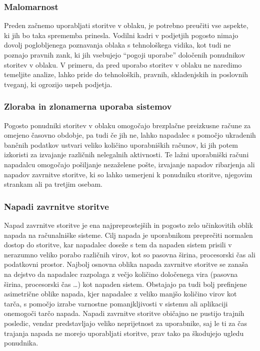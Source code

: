 \documentclass[12pt,a4paper,openany]{book}
\begin{document}
\subsubsection{Malomarnost}
Preden začnemo uporabljati storitve v oblaku, je potrebno preučiti vse aspekte, ki jih bo taka sprememba prinesla. Vodilni kadri v podjetjih pogosto nimajo dovolj poglobljenega poznavanja oblaka s tehnološkega vidika, kot tudi ne poznajo pravnih zank, ki jih vsebujejo “pogoji uporabe” določenih ponudnikov storitev v oblaku. V primeru, da pred uporabo storitev v oblaku ne naredimo temeljite analize, lahko pride do tehnoloških, pravnih, skladenjskih in poslovnih tveganj, ki ogrozijo uspeh podjetja.

\subsubsection{Zloraba in zlonamerna uporaba sistemov}
Pogosto ponudniki storitev v oblaku omogočajo brezplačne preizkusne račune za omejeno časovno obdobje, pa tudi če jih ne, lahko napadalec s pomočjo ukradenih bančnih podatkov ustvari veliko količino uporabniških računov, ki jih potem izkoristi za izvajanje različnih nelegalnih aktivnosti. Te lažni uporabniški računi napadalcu omogočajo pošiljanje nezaželene pošte, izvajanje napadov ribarjenja ali napadov zavrnitve storitve, ki so lahko usmerjeni k ponudniku storitve, njegovim strankam ali pa tretjim osebam.

\subsubsection{Napadi zavrnitve storitve}
Napad zavrnitve storitve je ena najpreprostejših in pogosto zelo učinkovitih oblik napada na računalniške sisteme. Cilj napada je uporabnikom preprečiti normalen dostop do storitve, kar napadalec doseže s tem da napaden sistem prisili v nerazumno veliko porabo različnih virov, kot so pasovna širina, procesorski čas ali podatkovni prostor. Najbolj osnovna oblika napada zavrnitve storitve se zanaša na dejstvo da napadalec razpolaga z večjo količino določenega vira (pasovna širina, procesorski čas …) kot napaden sistem. Obstajajo pa tudi bolj prefinjene asimetrične oblike napada, kjer napadalec z veliko manjšo količino virov kot tarča, s pomočjo izrabe varnostne pomanjkljivosti v sistemu ali aplikaciji onemogoči tarčo napada. Napadi zavrnitve storitve običajno ne pustijo trajnih posledic, vendar predstavljajo veliko neprijetnost za uporabnike, saj le ti za čas trajanja napada ne morejo uporabljati storitve, prav tako pa škodujejo ugledu ponudnika.
\end{document}
